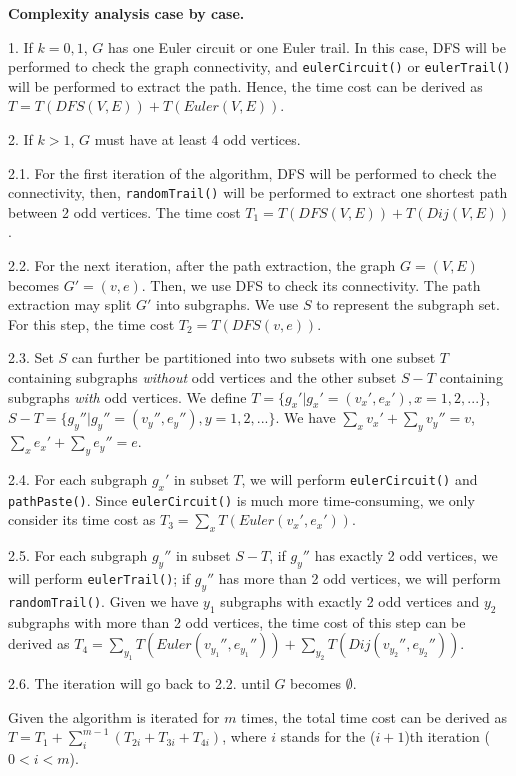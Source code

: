 \textbf{Complexity analysis case by case.}

1. If $k = 0,1$, $G$ has one Euler circuit or one Euler trail. In this case, DFS will be performed to check the graph connectivity, and \texttt{eulerCircuit()} or \texttt{eulerTrail()} will be performed to extract the path. Hence, the time cost can be derived as $T = T(DFS(V,E)) + T(Euler(V,E))$.

2. If $k > 1$, $G$ must have at least 4 odd vertices.

2.1. For the first iteration of the algorithm, DFS will be performed to check the connectivity, then, \texttt{randomTrail()} will be performed to extract one shortest path between 2 odd vertices. The time cost $T_1 = T(DFS(V,E)) + T(Dij(V,E))$.

2.2. For the next iteration, after the path extraction, the graph $G = (V, E)$ becomes $G' = (v, e)$. Then, we use DFS to check its connectivity. The path extraction may split $G'$ into subgraphs. We use $S$ to represent the subgraph set. For this step, the time cost $T_2 = T(DFS(v,e))$.

2.3. Set $S$ can further be partitioned into two subsets with one subset $T$ containing subgraphs \emph{without} odd vertices and the other subset $S-T$ containing subgraphs \emph{with} odd vertices. We define $T = \{g_x'|g_x'=(v_x', e_x'), x = 1,2,...\}$, $S-T = \{g_y''|g_y''=(v_y'',e_y''), y=1,2,...\}$. We have $\sum_{x}v_x' + \sum_{y}v_y'' = v$, $\sum_{x}e_x' + \sum_{y}e_y'' = e$.

2.4. For each subgraph $g_x'$ in subset $T$, we will perform \texttt{eulerCircuit()} and \texttt{pathPaste()}. Since \texttt{eulerCircuit()} is much more time-consuming, we only consider its time cost as $T_3 = \sum_xT(Euler(v_x',e_x'))$.

2.5. For each subgraph $g_y''$ in subset $S-T$, if $g_y''$ has exactly 2 odd vertices, we will perform \texttt{eulerTrail()}; if $g_y''$ has more than 2 odd vertices, we will perform \texttt{randomTrail()}. Given we have $y_1$ subgraphs with exactly 2 odd vertices and $y_2$ subgraphs with more than 2 odd vertices, the time cost of this step can be derived as $T_4 = \sum_{y_1}T(Euler(v_{y_1}'',e_{y_1}'')) + \sum_{y_2}T(Dij(v_{y_2}'',e_{y_2}''))$.

2.6. The iteration will go back to 2.2. until $G$ becomes $\emptyset$.

Given the algorithm is iterated for $m$ times, the total time cost can be derived as $T = T_1 + \sum_{i}^{m-1}(T_{2i} + T_{3i} + T_{4i})$, where $i$ stands for the ($i+1$)th iteration ($0 < i < m$).


